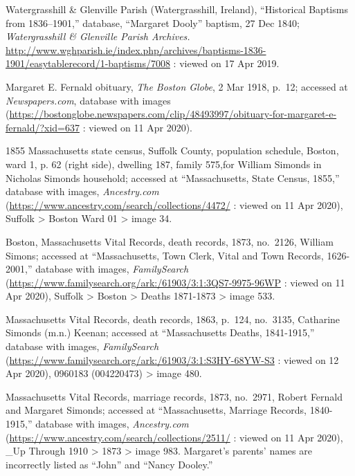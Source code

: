 \begin{thebibliography}{999}
	


Watergrasshill \& Glenville Parish (Watergrasshill, Ireland), ``Historical Baptisms from 1836--1901,'' database, ``Margaret Dooly'' baptism, 27 Dec 1840; \textit{Watergrasshill \& Glenville Parish Archives.} \url{http://www.wghparish.ie/index.php/archives/baptisms-1836-1901/easytablerecord/1-baptisms/7008} : viewed on 17 Apr 2019.

Margaret E. Fernald obituary, \textit{The Boston Globe}, 2 Mar 1918, p.\ 12; accessed at \textit{Newspapers.com}, database with images (\url{https://bostonglobe.newspapers.com/clip/48493997/obituary-for-margaret-e-fernald/?xid=637} : viewed on 11 Apr 2020).

1855 Massachusetts state census, Suffolk County, population schedule, Boston, ward 1, p. 62 (right side), dwelling 187, family 575,for William Simonds in Nicholas Simonds household; accessed at ``Massachusetts, State Census, 1855,'' database with images, \textit{Ancestry.com} (\url{https://www.ancestry.com/search/collections/4472/} : viewed on 11 Apr 2020), Suffolk > Boston Ward 01 > image 34.

Boston, Massachusetts Vital Records, death records, 1873, no.\ 2126, William Simons; accessed at ``Massachusetts, Town Clerk, Vital and Town Records, 1626-2001,'' database with images, \textit{FamilySearch} (\url{https://www.familysearch.org/ark:/61903/3:1:3QS7-9975-96WP} : viewed on 11 Apr 2020), Suffolk > Boston > Deaths 1871-1873 > image 533.

Massachusetts Vital Records, death records, 1863, p.\ 124, no.\ 3135, Catharine Simonds (m.n.) Keenan; accessed at ``Massachusetts Deaths, 1841-1915,'' database with images, \textit{FamilySearch} (\url{https://www.familysearch.org/ark:/61903/3:1:S3HY-68YW-S3} : viewed on 12 Apr 2020), 0960183 (004220473) > image 480.

Massachusetts Vital Records, marriage records, 1873, no.\ 2971, Robert Fernald and Margaret Simonds; accessed at ``Massachusetts, Marriage Records, 1840-1915,'' database with images, \textit{Ancestry.com} (\url{https://www.ancestry.com/search/collections/2511/} : viewed on 11 Apr 2020), \_Up Through 1910 > 1873 > image 983. Margaret's parents' names are incorrectly listed as ``John'' and ``Nancy Dooley.''


\end{thebibliography}
